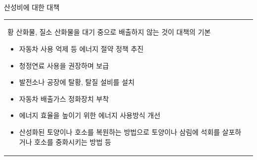 \begin{frame}[t]{산성비에 대한 대책}
	\begin{tabular}{ll}
		\begin{minipage}[t]{0.475\textwidth}\scriptsize
			
			황 산화물, 질소 산화물을 대기 중으로 배출하지 않는 것이 대책의 기본
			\begin{itemize}
				\item 자동차 사용 억제 등 에너지 절약 정책 추진
				\item 청정연료 사용을 권장하며 보급
				\item 발전소나 공장에 탈황, 탈질 설비를 설치
				\item 자동차 배출가스 정화장치 부착
				\item 에너지 효율을 높이기 위한 에너지 사용방식 개선
				\item 산성화된 토양이나 호소를 복원하는 방법으로 토양이나 삼림에 석회를 살포하거나 호소를 중화시키는 방법 등
				
			\end{itemize}
			
		\end{minipage}	
		&
		\begin{minipage}[t]{0.475\textwidth} \scriptsize	
		
		\end{minipage}

	\end{tabular}

\end{frame}

